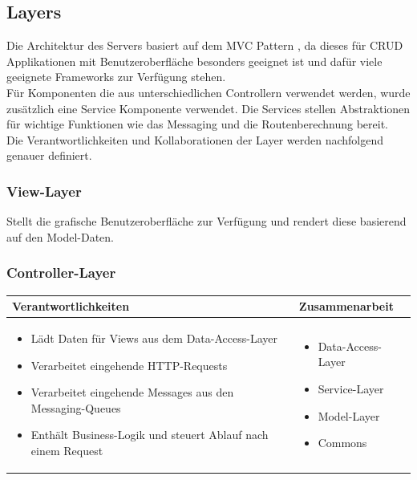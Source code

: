 \subsection{Layers}
Die Architektur des Servers basiert auf dem {MVC Pattern \cite{MVC}}, da dieses für \Gls{CRUD} Applikationen mit Benutzeroberfläche besonders geeignet ist und dafür viele geeignete Frameworks zur Verfügung stehen.\\

Für Komponenten die aus unterschiedlichen Controllern verwendet werden, wurde zusätzlich eine Service Komponente verwendet. Die Services stellen Abstraktionen für wichtige Funktionen wie das Messaging und die Routenberechnung bereit.\\

Die Verantwortlichkeiten und Kollaborationen der Layer werden nachfolgend genauer definiert.

\subsubsection{View-Layer}
Stellt die grafische Benutzeroberfläche zur Verfügung und rendert diese basierend auf den Model-Daten.

\subsubsection{Controller-Layer}
\begin{tabular}{|p{}|p{}|} \hline
	\textbf{Verantwortlichkeiten} & \textbf{Zusammenarbeit} \\ \hline \hline
	\begin{itemize}
		\item Lädt Daten für Views aus dem Data-Access-Layer
		\item Verarbeitet eingehende HTTP-Requests
		\item Verarbeitet eingehende Messages aus den Messaging-Queues
		\item Enthält Business-Logik und steuert Ablauf nach einem Request	
	\end{itemize}&
	\begin{itemize}
		\item Data-Access-Layer
		\item Service-Layer
		\item Model-Layer
		\item Commons
	\end{itemize}
	\\ \hline
\end{tabular}

